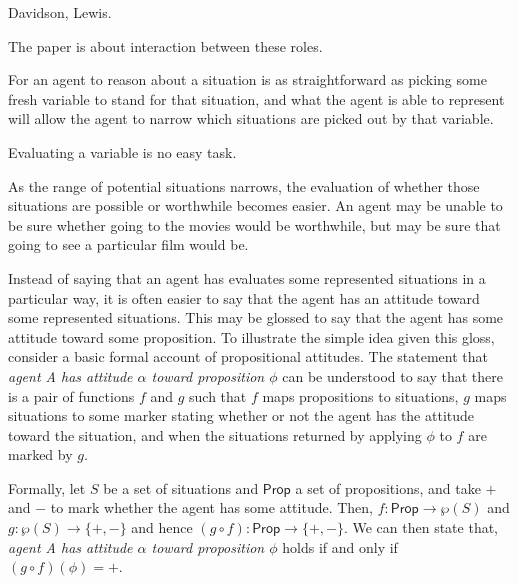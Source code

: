 \documentclass[10pt]{article}
\begin{document}
{\color{red} Davidson, Lewis.}



The paper is about interaction between these roles.






For an agent to reason about a situation is as straightforward as picking some fresh variable to stand for that situation, and what the agent is able to represent will allow the agent to narrow which situations are picked out by that variable.

Evaluating a variable is no easy task.

As the range of potential situations narrows, the evaluation of whether those situations are possible or worthwhile becomes easier.
An agent may be unable to be sure whether going to the movies would be worthwhile, but may be sure that going to see a particular film would be.







Instead of saying that an agent has evaluates some represented situations in a particular way, it is often easier to say that the agent has an attitude toward some represented situations.
This may be glossed to say that the agent has some attitude toward some proposition.
To illustrate the simple idea given this gloss, consider a basic formal account of propositional attitudes.
The statement that \emph{agent A has attitude \(\alpha\) toward proposition \(\phi\)} can be understood to say that there is a pair of functions \(f\) and \(g\) such that \(f\) maps propositions to situations, \(g\) maps situations to some marker stating whether or not the agent has the attitude toward the situation, and when the situations returned by applying \(\phi\) to \(f\) are marked by \(g\).

Formally, let \(S\) be a set of situations and \(\mathsf{Prop}\) a set of propositions, and take \(+\) and \(-\) to mark whether the agent has some attitude.
Then, \(f \colon \mathsf{Prop} \to \wp(S)\) and \(g \colon \wp(S) \to \{+,-\}\) and hence \((g \circ f) \colon \mathsf{Prop} \to \{+,-\}\).
We can then state that, \emph{agent A has attitude \(\alpha\) toward proposition \(\phi\)} holds if and only if \((g \circ f)(\phi) = +\).
\end{document}
